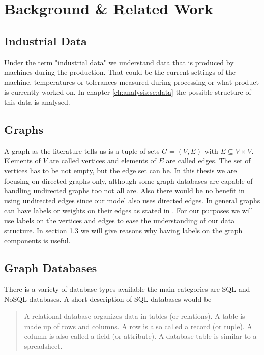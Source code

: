 \chapter{Background \& Related Work}
\label{ch:background}

\section{Industrial Data}
\label{ch:background:se:industrialData}
Under the term "industrial data" we understand data that is produced by machines during the production.
That could be the current settings of the machine,
temperatures or tolerances measured during processing or what product is currently worked on.
In chapter \ref{ch:analysis:se:data} the possible structure of this data is analysed.

\section{Graphs}
\label{ch:background:se:graphs}
A graph as the literature tells us \cite[89]{Worsch2011} is a tuple of sets $ G = (V, E) $ with $ E \subseteq V \times V $.
Elements of $ V $ are called vertices and elements of $ E $ are called edges.
The set of vertices has to be not empty, but the edge set can be.
In this thesis we are focusing on directed graphs only,
although some graph databases are capable of handling undirected graphs too not all are.
Also there would be no benefit in using undirected edges since our model also uses directed edges.
In general graphs can have labels or weights on their edges as stated in \cite[99]{Worsch2011}.
For our purposes we will use labels on the vertices and edges to ease the understanding of our data structure.
In section \ref{ch:background:se:graphDatabases} we will give reasons why having labels on the graph components is useful.

\section{Graph Databases}
\label{ch:background:se:graphDatabases}
There is a variety of database types available the main categories are SQL and NoSQL databases.
A short description of SQL databases would be
\blockquote[\cite{ChuaHock-Chuan}]{A relational database organizes data in tables (or relations).
A table is made up of rows and columns.
A row is also called a record (or tuple).
A column is also called a field (or attribute).
A database table is similar to a spreadsheet.}

